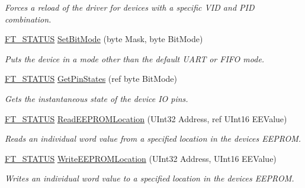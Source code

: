 \begin{DoxyCompactItemize}
\begin{DoxyCompactList}\small\item\em Forces a reload of the driver for devices with a specific V\+ID and P\+ID combination. \end{DoxyCompactList}\item 
\mbox{\hyperlink{class_f_t_d2_x_x___n_e_t_1_1_f_t_d_i_aabe20ad905cc4ccc1e35dd5b877d9a83}{F\+T\+\_\+\+S\+T\+A\+T\+US}} \mbox{\hyperlink{class_f_t_d2_x_x___n_e_t_1_1_f_t_d_i_a7cca88354e77e1bc0967a13192824e1e}{Set\+Bit\+Mode}} (byte Mask, byte Bit\+Mode)
\begin{DoxyCompactList}\small\item\em Puts the device in a mode other than the default U\+A\+RT or F\+I\+FO mode. \end{DoxyCompactList}\item 
\mbox{\hyperlink{class_f_t_d2_x_x___n_e_t_1_1_f_t_d_i_aabe20ad905cc4ccc1e35dd5b877d9a83}{F\+T\+\_\+\+S\+T\+A\+T\+US}} \mbox{\hyperlink{class_f_t_d2_x_x___n_e_t_1_1_f_t_d_i_acff618b6dc97a27a1d5fb0554c945f61}{Get\+Pin\+States}} (ref byte Bit\+Mode)
\begin{DoxyCompactList}\small\item\em Gets the instantaneous state of the device IO pins. \end{DoxyCompactList}\item 
\mbox{\hyperlink{class_f_t_d2_x_x___n_e_t_1_1_f_t_d_i_aabe20ad905cc4ccc1e35dd5b877d9a83}{F\+T\+\_\+\+S\+T\+A\+T\+US}} \mbox{\hyperlink{class_f_t_d2_x_x___n_e_t_1_1_f_t_d_i_a10827135a2d0ba744d01796172be6a07}{Read\+E\+E\+P\+R\+O\+M\+Location}} (U\+Int32 Address, ref U\+Int16 E\+E\+Value)
\begin{DoxyCompactList}\small\item\em Reads an individual word value from a specified location in the device\textquotesingle{}s E\+E\+P\+R\+OM. \end{DoxyCompactList}\item 
\mbox{\hyperlink{class_f_t_d2_x_x___n_e_t_1_1_f_t_d_i_aabe20ad905cc4ccc1e35dd5b877d9a83}{F\+T\+\_\+\+S\+T\+A\+T\+US}} \mbox{\hyperlink{class_f_t_d2_x_x___n_e_t_1_1_f_t_d_i_af141c36e0d4a39824c556d066bd90282}{Write\+E\+E\+P\+R\+O\+M\+Location}} (U\+Int32 Address, U\+Int16 E\+E\+Value)
\begin{DoxyCompactList}\small\item\em Writes an individual word value to a specified location in the device\textquotesingle{}s E\+E\+P\+R\+OM. \end{DoxyCompactList}\item 

\end{DoxyCompactItemize}
